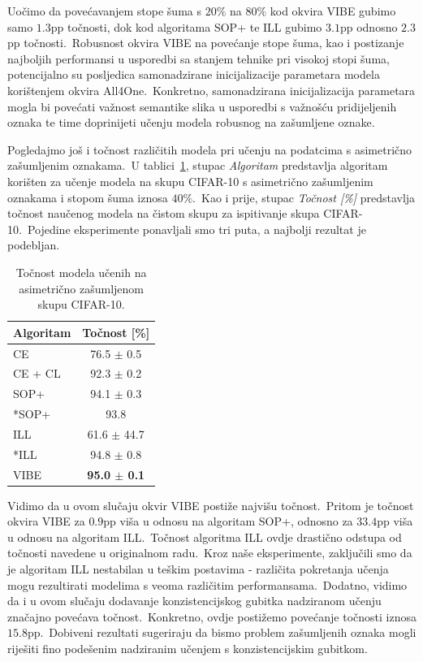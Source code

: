 \documentclass[diplomskirad]{fer}
\begin{document}
Uočimo da povećavanjem stope šuma s $20\%$ na $80\%$ kod okvira VIBE gubimo samo $1.3$pp točnosti, dok kod algoritama SOP+ te ILL gubimo $3.1$pp odnosno $2.3$pp točnosti.\ 
Robusnost okvira VIBE na povećanje stope šuma, kao i postizanje najboljih performansi u usporedbi sa stanjem tehnike pri visokoj stopi šuma, potencijalno su posljedica samonadzirane inicijalizacije parametara modela korištenjem okvira All4One.\ 
Konkretno, samonadzirana inicijalizacija parametara mogla bi povećati važnost semantike slika u usporedbi s važnošću pridijeljenih oznaka te time doprinijeti učenju modela robusnog na zašumljene oznake.\

Pogledajmo još i točnost različitih modela pri učenju na podatcima s asimetrično zašumljenim oznakama.\ 
U tablici~\ref{tbl:usporedba_asimetricne}, stupac \textit{Algoritam} predstavlja algoritam korišten za učenje modela na skupu CIFAR-10 s asimetrično zašumljenim oznakama i stopom šuma iznosa $40\%$.\ 
Kao i prije, stupac \textit{Točnost [\%]} predstavlja točnost naučenog modela na čistom skupu za ispitivanje skupa CIFAR-10.\ Pojedine eksperimente ponavljali smo tri puta, a najbolji rezultat je podebljan.\ 

\begin{table}[htb]
  \caption{Točnost modela učenih na asimetrično zašumljenom skupu CIFAR-10.}
  \label{tbl:usporedba_asimetricne}
  \centering
  \begin{tabular}{l||c}
  Algoritam & Točnost [\%] \\ \hline \hline
  CE & 76.5 $\pm$ 0.5 \\
  CE + CL & 92.3 $\pm$ 0.2 \\ \hline
  SOP+ & 94.1 $\pm$ 0.3 \\
  *SOP+ & 93.8 \\
  ILL & 61.6 $\pm$ 44.7 \\ 
  *ILL & 94.8 $\pm$ 0.8 \\ \hline
  VIBE & \textbf{95.0 $\pm$ 0.1} \\
  \end{tabular}
\end{table}

Vidimo da u ovom slučaju okvir VIBE postiže najvišu točnost.\ Pritom je točnost okvira VIBE za $0.9$pp viša u odnosu na algoritam SOP+, odnosno za $33.4$pp viša u odnosu na algoritam ILL.\ 
Točnost algoritma ILL ovdje drastično odstupa od točnosti navedene u originalnom radu.\ Kroz naše eksperimente, zaključili smo da je algoritam ILL nestabilan u teškim postavima - različita pokretanja učenja mogu rezultirati modelima s veoma različitim performansama.\ 
Dodatno, vidimo da i u ovom slučaju dodavanje konzistencijskog gubitka nadziranom učenju značajno povećava točnost.\ Konkretno, ovdje postižemo povećanje točnosti iznosa $15.8$pp.\ 
Dobiveni rezultati sugeriraju da bismo problem zašumljenih oznaka mogli riješiti fino podešenim nadziranim učenjem s konzistencijskim gubitkom.\ 
\end{document}
